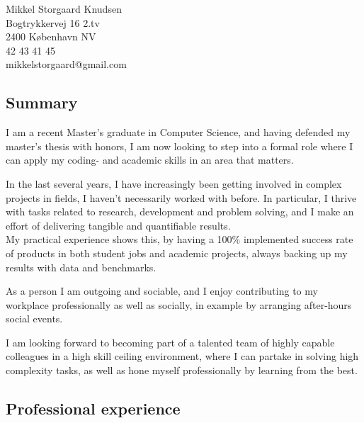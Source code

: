 \documentclass[10pt, a4paper]{article}
\begin{document}
Mikkel Storgaard Knudsen \\
Bogtrykkervej 16 2.tv \\
2400 København NV \\
42 43 41 45 \\
mikkelstorgaard@gmail.com

\subsection*{Summary}
I am a recent Master's graduate in Computer Science, and having defended my master's thesis with honors, 
I am now looking to step into a formal role where I can apply my coding- and 
academic skills in an area that matters.

In the last several years, I have increasingly been getting involved in complex
projects in fields, I haven't necessarily worked with before. In particular, I thrive with tasks related to
research, development and problem solving, and I make an effort of delivering
tangible and quantifiable results.\\
My practical experience shows this, by having a 100\% implemented success rate of products
in both student jobs and academic projects, always backing up my results with
data and benchmarks.

As a person I am outgoing and sociable, and I enjoy contributing to my
workplace professionally as well as socially, in example by arranging after-hours social
events.

I am looking forward to becoming part of a talented team of highly capable
colleagues in a high skill ceiling environment, where I can partake in solving high
complexity tasks, as well as hone myself professionally by learning from the
best.

\subsection*{Professional experience}
\end{document}
